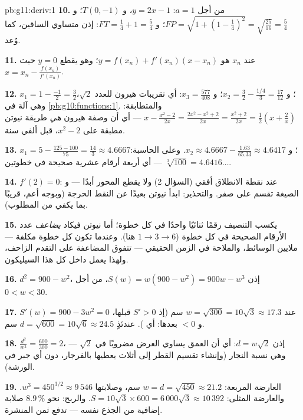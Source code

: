 \begin{solution}{pb:g11:deriv:1}
\textbf{10.} من أجل $a = 1$:  $y = 2x - 1$، و $T(0, -1)$؛ و
$FP = \sqrt{1 + \left(1 - \frac14\right)^2} =
\sqrt{\frac{25}{16}} = \frac54$؛ و $FT = \frac14 + 1 = \frac54$:
إذن متساوي الساقين، كما وُعد.

\textbf{11.}  عند $x_n$ هو
$y = f(x_n) + f'(x_n)(x - x_n)$؛ وهو يقطع $y = 0$ حيث
$x = x_n - \frac{f(x_n)}{f'(x_n)}$.

\textbf{12.} $x_1 = 1 - \frac{-1}{2} = \frac32$؛
و $x_2 = \frac32 - \frac{1/4}{3} = \frac{17}{12}$؛
و $x_3 = \frac{577}{408}$: أي تقريبات هيرون للعدد $\sqrt2$،
وهي آلة  في \cref{pb:g10:functions:1}.
والمتطابقة: $x - \frac{x^2 - 2}{2x} = \frac{2x^2 - x^2 + 2}{2x}
= \frac{x^2 + 2}{2x} = \frac12\left(x + \frac2x\right)$ ---
أي أن وصفة هيرون \emph{هي} طريقة نيوتن مطبقة على
$x^2 - 2$، قبل ألفي سنة.

\textbf{13.} $x_1 = 5 - \frac{125 - 100}{75} = \frac{14}{3}
\approx 4.6667$؛ و $x_2 \approx 4.6667 - \frac{1.63}{65.33}
\approx 4.6417$. وعلى الحاسبة: $\sqrt[3]{100} = 4.6416\ldots$ ---
أي أربعة أرقام عشرية صحيحة في خطوتين.

\textbf{14.} $f'(2) = 0$:  عند نقطة الانطلاق
أفقي (السؤال 2) ولا يقطع المحور أبدًا --- و
الصيغة تقسم على صفر. والتحذير: ابدأ نيوتن بعيدًا عن
النقط الحرجة (وبوجه أعم، قريبًا بما يكفي من 
المطلوب).

\textbf{15.} يكسب التنصيف رقمًا ثنائيًا واحدًا في كل خطوة؛ أما نيوتن
فيكاد \emph{يضاعف} عدد الأرقام الصحيحة في كل خطوة
($1 \to 3 \to 6$ هنا). وعندما تكون كل خطوة مكلفة --- ملايين
الوسائط، والملاحة في الزمن الحقيقي --- تتفوق المضاعفة على
التقدم الزاحف، ولهذا يعمل  داخل كل هذا
السيليكون.

\textbf{16.} $d^2 = 900 - w^2$، إذن
$S(w) = w(900 - w^2) = 900w - w^3$، من أجل $0 < w < 30$.

\textbf{17.} $S'(w) = 900 - 3w^2 = 0$ عند
$w = \sqrt{300} = 10\sqrt3 \approx 17.3$ سم (إذ $S' > 0$ قبلها، و
$< 0$ بعدها: أي ). عندئذٍ
$d = \sqrt{600} = 10\sqrt6 \approx 24.5$ سم.

\textbf{18.} $\frac{d^2}{w^2} = \frac{600}{300} = 2$، إذن
$d = w\sqrt2$: أي أن العمق يساوي العرض مضروبًا في $\sqrt2$ ---
وهي نسبة النجار (وإنشاء تقسيم القطر إلى أثلاث
يعطيها بالفرجار، دون أي جبر في الورشة).

\textbf{19.} العارضة المربعة: $w = d = \sqrt{450} \approx 21.2$
سم، وصلابتها $w^3 = 450^{3/2} \approx 9\,546$. والعارضة المثلى:
$S = 10\sqrt3 \times 600 = 6\,000\sqrt3 \approx 10\,392$. والربح:
نحو $8.9\,\%$ صلابة إضافية من الجذع نفسه --- 
تدفع ثمن المنشرة.


\end{solution}
